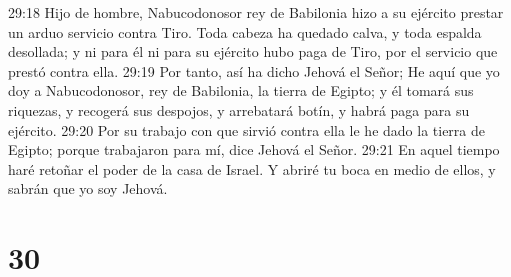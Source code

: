 29:18 Hijo de hombre, Nabucodonosor rey de Babilonia hizo a su ejército prestar un arduo servicio contra Tiro. Toda cabeza ha quedado calva, y toda espalda desollada; y ni para él ni para su ejército hubo paga de Tiro, por el servicio que prestó contra ella.  
29:19 Por tanto, así ha dicho Jehová el Señor; He aquí que yo doy a Nabucodonosor, rey de Babilonia, la tierra de Egipto; y él tomará sus riquezas, y recogerá sus despojos, y arrebatará botín, y habrá paga para su ejército.  
29:20 Por su trabajo con que sirvió contra ella le he dado la tierra de Egipto; porque trabajaron para mí, dice Jehová el Señor.  
29:21 En aquel tiempo haré retoñar el poder de la casa de Israel. Y abriré tu boca en medio de ellos, y sabrán que yo soy Jehová.  

\chapter{30}

